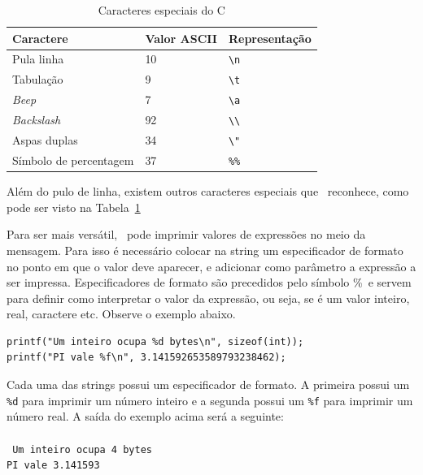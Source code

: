 \begin{table}
\centering
  \begin{tabular}{|l|l|l|}
    \hline
        Caractere               & Valor ASCII & Representação \\
    \hline
        Pula linha              & 10          & \verb|\n|     \\
        Tabulação               & 9           & \verb|\t|     \\
        {\it Beep}              & 7           & \verb|\a|     \\
        {\it Backslash}         & 92          & \verb|\\|     \\
        Aspas duplas            & 34          & \verb|\"|     \\
        Símbolo de percentagem  & 37          & \verb|%%|     \\
    \hline
  \end{tabular}
  \caption{Caracteres especiais do C}
  \label{tab:chars}
\end{table}


Além do pulo de linha, existem outros caracteres especiais que \PRINTF\ reconhece, como pode ser visto na Tabela~\ref{tab:chars}

\pagebreak

Para ser mais versátil, \PRINTF\ pode imprimir valores de expressões no meio da mensagem. Para isso é necessário colocar na string um especificador de formato no ponto em que o valor deve aparecer, e adicionar como parâmetro a expressão a ser impressa. Especificadores de formato são precedidos pelo símbolo \%\ e servem para definir como interpretar o valor da expressão, ou seja, se é um valor inteiro, real, caractere etc. Observe o exemplo abaixo.

\begin{lstlisting}
printf("Um inteiro ocupa %d bytes\n", sizeof(int));
printf("PI vale %f\n", 3.141592653589793238462);
\end{lstlisting}

Cada uma das strings possui um especificador de formato. A primeira possui um {\tt \%d} 
para imprimir um número inteiro e a segunda possui um {\tt \%f}
para imprimir um número real.
A saída do exemplo acima será a seguinte:\\
\\
{\tt
Um inteiro ocupa 4 bytes\\
PI vale 3.141593\\
}

